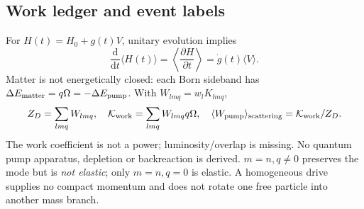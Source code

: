 \documentclass[11pt,a4paper]{article}
\newcommand{\dd}{\mathrm d}
\begin{document}
\subsection*{Work ledger and event labels}
For $H(t)=H_0+g(t)V$, unitary evolution implies
\begin{equation}
 \frac{\dd}{\dd t}\langle H(t)\rangle
 =\left\langle\frac{\partial H}{\partial t}\right\rangle
 =\dot g(t)\langle V\rangle .
\end{equation}
Matter is not energetically closed: each Born sideband has
$\Delta E_{\rm matter}=q\Omega=-\Delta E_{\rm pump}$.
With $W_{lmq}=w_lK_{lmq}$,
\begin{equation}
 Z_D=\sum_{lmq}W_{lmq},\quad
 {\cal K}_{\rm work}=\sum_{lmq}W_{lmq}q\Omega,\quad
 \langle W_{\rm pump}\rangle_{\rm scattering}
 ={\cal K}_{\rm work}/Z_D .
\end{equation}
The work coefficient is not a power; luminosity/overlap is missing.
No quantum pump apparatus, depletion or backreaction is derived.
$m=n,q\ne0$ preserves the mode but is \emph{not elastic};
only $m=n,q=0$ is elastic. A homogeneous drive supplies no compact
momentum and does not rotate one free particle into another mass branch.
\end{document}

